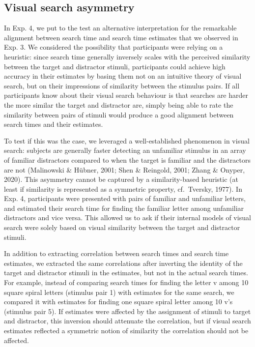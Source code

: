 \documentclass[12pt,twoside]{reedthesis}
\begin{document}
\hypertarget{asymmetry}{%
\subsection*{Visual search asymmetry}\label{asymmetry}}

In Exp. 4, we put to the test an alternative interpretation for the remarkable alignment between search time and search time estimates that we observed in Exp. 3. We considered the possibility that participants were relying on a heuristic: since search time generally inversely scales with the perceived similarity between the target and distractor stimuli, participants could achieve high accuracy in their estimates by basing them not on an intuitive theory of visual search, but on their impressions of similarity between the stimulus pairs. If all participants know about their visual search behaviour is that searches are harder the more similar the target and distractor are, simply being able to rate the similarity between pairs of stimuli would produce a good alignment between search times and their estimates.

To test if this was the case, we leveraged a well-established phenomenon in visual search: subjects are generally faster detecting an unfamiliar stimulus in an array of familiar distractors compared to when the target is familiar and the distractors are not (Malinowski \& Hübner, 2001; Shen \& Reingold, 2001; Zhang \& Onyper, 2020). This asymmetry cannot be captured by a similarity-based heuristic (at least if similarity is represented as a symmetric property, cf.~Tversky, 1977). In Exp. 4, participants were presented with pairs of familiar and unfamiliar letters, and estimated their search time for finding the familiar letter among unfamiliar distractors and vice versa. This allowed us to ask if their internal models of visual search were solely based on visual similarity between the target and distractor stimuli.

In addition to extracting correlation between search times and search time estimates, we extracted the same correlations after inverting the identity of the target and distractor stimuli in the estimates, but not in the actual search times. For example, instead of comparing search times for finding the letter v among 10 square spiral letters (stimulus pair 1) with estimates for the same search, we compared it with estimates for finding one square spiral letter among 10 v's (stimulus pair 5). If estimates were affected by the assignment of stimuli to target and distractor, this inversion should attenuate the correlation, but if visual search estimates reflected a symmetric notion of similarity the correlation should not be affected.
\end{document}
